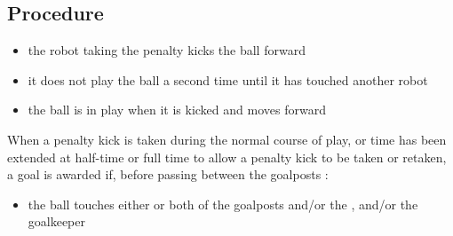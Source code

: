 \subsection{Procedure}
\begin{itemize}
\item the robot taking the penalty kicks the ball forward
\item it does not play the ball a second time until it has touched another robot
\item the ball is in play when it is kicked and moves forward
\end{itemize}

When a penalty kick is taken during the normal course of play, or time has been extended at half-time or full time to allow a penalty kick to be taken or retaken, a goal is awarded if, before passing between the goalposts :
\begin{itemize}
\item the ball touches either or both of the goalposts and/or the  , and/or the goalkeeper
\end{itemize}

